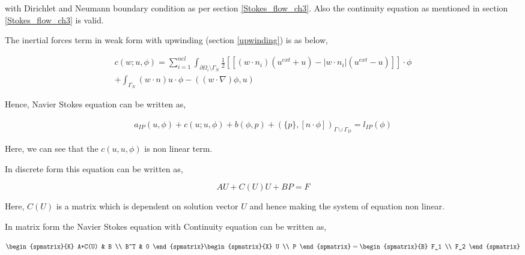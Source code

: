 \documentclass[a4paper,12pt]{book}
\begin{document}
with Dirichlet and Neumann boundary condition as per section \ref{Stokes_flow_ch3}. Also the continuity equation as mentioned in section \ref{Stokes_flow_ch3} is valid.

The inertial forces term in weak form with upwinding (section \ref{upwinding}) is as below,

\begin{equation}
\begin{split}
c(w;u,\phi) = \sum_{i=1}^{nel} \int_{\partial \Omega_i \setminus \Gamma_N} \frac{1}{2} [[(w \cdot n_i)(u^{ext} + u) - |w \cdot n_i|(u^{ext} - u)]] \cdot \phi \\ + \int_{\Gamma_N} (w\cdot n) u \cdot \phi -((w\cdot \nabla)\phi,u)
\end{split}
\end{equation}

Hence, Navier Stokes equation can be written as,

\begin{equation}\label{navier_stokes_weak_ch3}
\begin{split}
a_{IP}(u,\phi) + c(u;u,\phi) + b(\phi,p) + (\{p\},[n\cdot \phi])_{\Gamma \cup \Gamma_D} = l_{IP}(\phi) 
\end{split}
\end{equation}

Here, we can see that the $c(u,u,\phi)$ is non linear term.

In discrete form this equation can be written as,

\begin{equation}
AU + C(U) U + BP = F
\end{equation} 

Here, $C(U)$ is a matrix which is dependent on solution vector $U$ and hence making the system of equation non linear.

In matrix form the Navier Stokes equation with Continuity equation can be written as,

\begin{equation} \label{Stokes_matrix_ch3}
\begin{spmatrix}{K}
    A+C(U) & B \\
    B^T & 0
\end{spmatrix}
\begin{spmatrix}{X}
    U \\
    P
\end{spmatrix}
=
\begin{spmatrix}{B}
    F_1  \\
    F_2
\end{spmatrix}
\end{equation}
\end{document}
